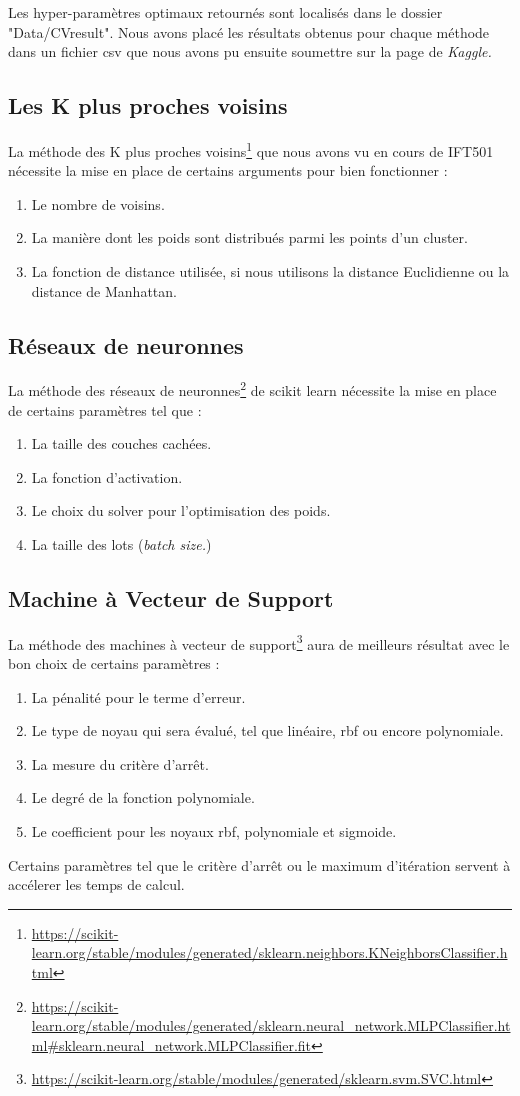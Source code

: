 \documentclass[12pt]{article}
\begin{document}
Les hyper-paramètres optimaux retournés sont localisés dans le dossier "Data/CVresult". Nous avons placé les résultats obtenus pour chaque méthode dans un fichier csv que nous avons pu ensuite soumettre sur la page de \textit{Kaggle.} 

\subsection{Les K plus proches voisins}
La méthode des K plus proches voisins\footnote{\url{https://scikit-learn.org/stable/modules/generated/sklearn.neighbors.KNeighborsClassifier.html}} que nous avons vu en cours de IFT501 nécessite la mise en place de certains arguments pour bien fonctionner : \begin{enumerate}
\item Le nombre de voisins.
\item La manière dont les poids sont distribués parmi les points d'un cluster.
\item La fonction de distance utilisée, si nous utilisons la distance Euclidienne ou la distance de Manhattan.
\end{enumerate}


\subsection{Réseaux de neuronnes}
La méthode des réseaux de neuronnes\footnote{\url{https://scikit-learn.org/stable/modules/generated/sklearn.neural_network.MLPClassifier.html\#sklearn.neural_network.MLPClassifier.fit}} de scikit learn nécessite la mise en place de certains paramètres tel que :
\begin{enumerate}
\item La taille des couches cachées.
\item La fonction d'activation.
\item Le choix du solver pour l'optimisation des poids.
\item La taille des lots (\textit{batch size.}) 
\end{enumerate}

\subsection{Machine à Vecteur de Support}
La méthode des machines à vecteur de support\footnote{\url{https://scikit-learn.org/stable/modules/generated/sklearn.svm.SVC.html}} aura de meilleurs résultat avec le bon choix de certains paramètres : 
\begin{enumerate}
\item La pénalité pour le terme d'erreur.
\item Le type de noyau qui sera évalué, tel que linéaire, rbf ou encore polynomiale.
\item La mesure du critère d'arrêt.
\item Le degré de la fonction polynomiale.
\item Le coefficient pour les noyaux rbf, polynomiale et sigmoide.
\end{enumerate}
Certains paramètres tel que le critère d'arrêt ou le maximum d'itération servent à accélerer les temps de calcul. 
\end{document}
